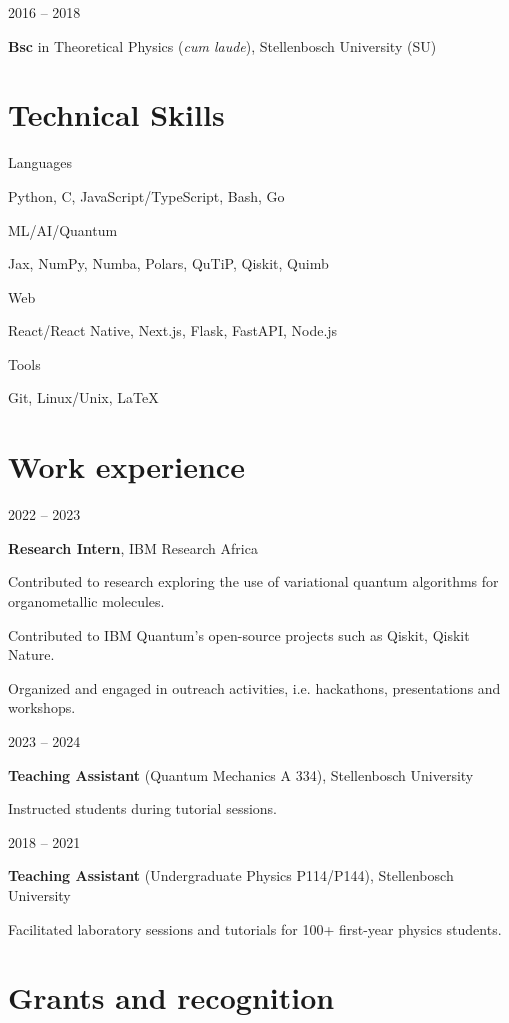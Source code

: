 \documentclass[9pt]{extreport}
\newcommand{\listitemspace}{0.25em}
\renewenvironment{itemize}
{\begin{list}{}{
    \setlength{\leftmargin}{0em}
    \setlength{\parskip}{0em}
    \setlength{\itemsep}{\listitemspace}
    \setlength{\parsep}{\listitemspace}}}
{\end{list}}
\newcommand{\entry}[2]{%
  \noindent%
  \begin{minipage}[t]{2.25cm}%
    \raggedright #1%
  \end{minipage}%
  \hspace{0.4cm}%
  \begin{minipage}[t]{\dimexpr\textwidth-2cm\relax}%
    #2%
  \end{minipage}%
  \vspace{0.25cm}%
}
\begin{document}
\entry{2016 -- 2018}{\textbf{Bsc} in Theoretical Physics (\textit{cum laude}), Stellenbosch University (SU)}

\section*{Technical Skills}

\entry{Languages}{Python, C, JavaScript/TypeScript, Bash, Go}

\entry{ML/AI/Quantum}{Jax, NumPy, Numba, Polars, QuTiP, Qiskit, Quimb}

\entry{Web}{React/React Native, Next.js, Flask, FastAPI, Node.js}

\entry{Tools}{Git, Linux/Unix, LaTeX}

\section*{Work experience}

\entry{2022 -- 2023}{\textbf{Research Intern}, IBM Research Africa
\begin{itemize}
    \item Contributed to research exploring the use of variational quantum algorithms for organometallic molecules.
    \item Contributed to IBM Quantum's open-source projects such as Qiskit, Qiskit Nature.
    \item Organized and engaged in outreach activities, i.e. hackathons, presentations and workshops.
\end{itemize}}

\entry{2023 -- 2024}{\textbf{Teaching Assistant} (Quantum Mechanics A 334), Stellenbosch University
\begin{itemize}
  \item Instructed students during tutorial sessions.
\end{itemize}}

\entry{2018 -- 2021}{\textbf{Teaching Assistant} (Undergraduate Physics P114/P144), Stellenbosch University
\begin{itemize}
  \item Facilitated laboratory sessions and tutorials for 100+ first-year physics students.
\end{itemize}}

\section*{Grants and recognition}
\end{document}
